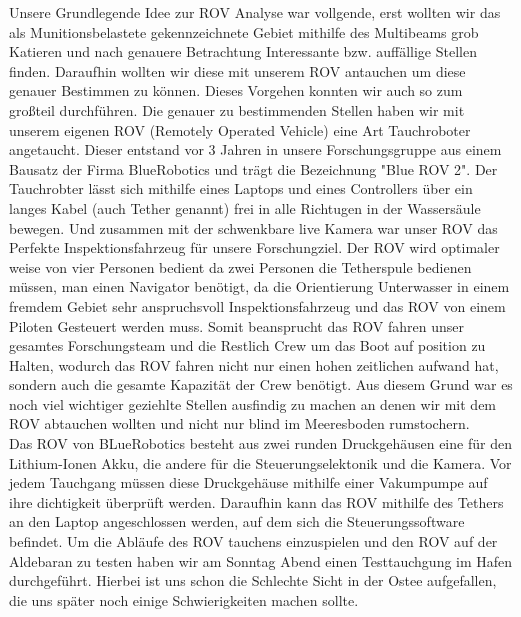 
Unsere Grundlegende Idee zur ROV Analyse war vollgende, erst wollten wir das als Munitionsbelastete gekennzeichnete Gebiet mithilfe 
des Multibeams grob Katieren und nach genauere Betrachtung 
Interessante bzw. auffällige Stellen finden. Daraufhin wollten wir diese mit unserem ROV antauchen um diese genauer Bestimmen zu können.
Dieses Vorgehen konnten wir auch so zum großteil durchführen.
Die genauer zu bestimmenden Stellen haben wir mit unserem eigenen ROV (Remotely Operated Vehicle) eine Art Tauchroboter angetaucht. 
Dieser entstand vor 3 Jahren in unsere Forschungsgruppe aus einem Bausatz der Firma BlueRobotics und trägt die Bezeichnung "Blue ROV 2".
Der Tauchrobter lässt sich mithilfe eines Laptops und eines Controllers über ein langes Kabel (auch Tether genannt) frei in alle Richtugen in der Wassersäule bewegen.
Und zusammen mit der schwenkbare live Kamera war unser ROV das Perfekte Inspektionsfahrzeug für unsere Forschungziel. Der ROV wird optimaler weise 
von vier Personen bedient da zwei Personen die Tetherspule bedienen müssen, man einen Navigator benötigt, da die Orientierung Unterwasser in einem fremdem Gebiet sehr anspruchsvoll Inspektionsfahrzeug und das ROV von einem Piloten Gesteuert werden muss.
Somit beansprucht das ROV fahren unser gesamtes Forschungsteam und die Restlich Crew um das Boot auf position zu Halten, wodurch das ROV fahren nicht nur einen hohen zeitlichen aufwand hat, sondern auch die gesamte Kapazität der Crew benötigt.
Aus diesem Grund war es noch viel wichtiger geziehlte Stellen ausfindig zu machen an denen wir mit dem ROV abtauchen wollten und nicht nur blind im Meeresboden rumstochern.
\\

Das ROV von BLueRobotics besteht aus zwei runden Druckgehäusen eine für den Lithium-Ionen Akku, die andere für die Steuerungselektonik und die Kamera.
Vor jedem Tauchgang müssen diese Druckgehäuse mithilfe einer Vakumpumpe auf ihre dichtigkeit überprüft werden. 
Daraufhin kann das ROV mithilfe des Tethers an den Laptop angeschlossen werden, auf dem sich die Steuerungssoftware befindet.
Um die Abläufe des ROV tauchens einzuspielen und den ROV auf der Aldebaran zu testen haben wir am Sonntag Abend einen Testtauchgung im Hafen durchgeführt. 
Hierbei ist uns schon die Schlechte Sicht in der Ostee aufgefallen, die uns später noch einige Schwierigkeiten machen sollte.
\\

